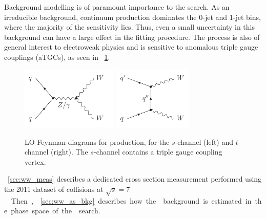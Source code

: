
Background modelling is of paramount importance to the \HWW search. As an irreducible 
background, continuum \WWlvlv production dominates the 0-jet and 1-jet bins, where the 
majority of the sensitivity lies. Thus, even a small uncertainty in this background can 
have a large effect in the fitting procedure. The process is also of general interest to 
electroweak physics and is sensitive to anomalous triple gauge couplings (aTGCs), as seen 
in \Figure~\ref{fig:WW:feyn}.

\begin{figure}[b]
	\null\hfill
	\includegraphics[height=3cm]{axodraw/WW_schannel.pdf}
	\hfill
	\includegraphics[height=3cm]{axodraw/WW_tchannel.pdf}
	\hfill\null
	\caption{LO Feynman diagrams for \HepProcess{\qqbar \HepTo \WW} production, for the 
	$s$-channel (left) and $t$-channel (right). The $s$-channel contains a triple gauge 
	coupling vertex.}
	\label{fig:WW:feyn}
\end{figure}

\Section~\ref{sec:ww_meas} describes a dedicated \WW cross section measurement performed 
using the 2011 dataset of \pp collisions at \unit{$\sqrt{s} = 7$}{\TeV}. Then, 
\Section~\ref{sec:ww_as_bkg} describes how the \WW background is estimated in the phase 
space of the \HWW search.

